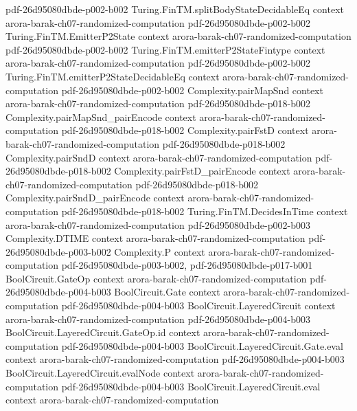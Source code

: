 \begin{theorem}
  {pdf-26d95080dbde-p002-b002}
\proofstep
  {Turing.FinTM.splitBodyStateDecidableEq}
  {context}
  {arora-barak-ch07-randomized-computation}
  {pdf-26d95080dbde-p002-b002}
\proofstep
  {Turing.FinTM.EmitterP2State}
  {context}
  {arora-barak-ch07-randomized-computation}
  {pdf-26d95080dbde-p002-b002}
\proofstep
  {Turing.FinTM.emitterP2StateFintype}
  {context}
  {arora-barak-ch07-randomized-computation}
  {pdf-26d95080dbde-p002-b002}
\proofstep
  {Turing.FinTM.emitterP2StateDecidableEq}
  {context}
  {arora-barak-ch07-randomized-computation}
  {pdf-26d95080dbde-p002-b002}
\proofstep
  {Complexity.pairMapSnd}
  {context}
  {arora-barak-ch07-randomized-computation}
  {pdf-26d95080dbde-p018-b002}
\proofstep
  {Complexity.pairMapSnd_pairEncode}
  {context}
  {arora-barak-ch07-randomized-computation}
  {pdf-26d95080dbde-p018-b002}
\proofstep
  {Complexity.pairFstD}
  {context}
  {arora-barak-ch07-randomized-computation}
  {pdf-26d95080dbde-p018-b002}
\proofstep
  {Complexity.pairSndD}
  {context}
  {arora-barak-ch07-randomized-computation}
  {pdf-26d95080dbde-p018-b002}
\proofstep
  {Complexity.pairFstD_pairEncode}
  {context}
  {arora-barak-ch07-randomized-computation}
  {pdf-26d95080dbde-p018-b002}
\proofstep
  {Complexity.pairSndD_pairEncode}
  {context}
  {arora-barak-ch07-randomized-computation}
  {pdf-26d95080dbde-p018-b002}
\proofstep
  {Turing.FinTM.DecidesInTime}
  {context}
  {arora-barak-ch07-randomized-computation}
  {pdf-26d95080dbde-p002-b003}
\proofstep
  {Complexity.DTIME}
  {context}
  {arora-barak-ch07-randomized-computation}
  {pdf-26d95080dbde-p003-b002}
\proofstep
  {Complexity.P}
  {context}
  {arora-barak-ch07-randomized-computation}
  {pdf-26d95080dbde-p003-b002,
    pdf-26d95080dbde-p017-b001}
\proofstep
  {BoolCircuit.GateOp}
  {context}
  {arora-barak-ch07-randomized-computation}
  {pdf-26d95080dbde-p004-b003}
\proofstep
  {BoolCircuit.Gate}
  {context}
  {arora-barak-ch07-randomized-computation}
  {pdf-26d95080dbde-p004-b003}
\proofstep
  {BoolCircuit.LayeredCircuit}
  {context}
  {arora-barak-ch07-randomized-computation}
  {pdf-26d95080dbde-p004-b003}
\proofstep
  {BoolCircuit.LayeredCircuit.GateOp.id}
  {context}
  {arora-barak-ch07-randomized-computation}
  {pdf-26d95080dbde-p004-b003}
\proofstep
  {BoolCircuit.LayeredCircuit.Gate.eval}
  {context}
  {arora-barak-ch07-randomized-computation}
  {pdf-26d95080dbde-p004-b003}
\proofstep
  {BoolCircuit.LayeredCircuit.evalNode}
  {context}
  {arora-barak-ch07-randomized-computation}
  {pdf-26d95080dbde-p004-b003}
\proofstep
  {BoolCircuit.LayeredCircuit.eval}
  {context}
  {arora-barak-ch07-randomized-computation}

\end{theorem}
